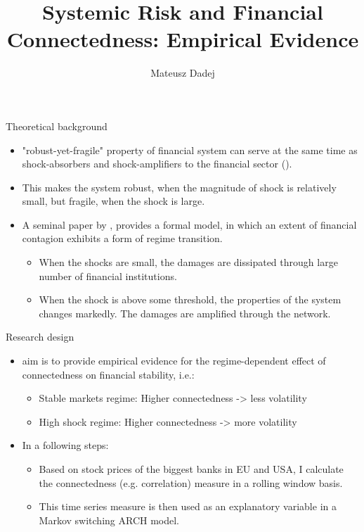 \documentclass{beamer}
\title{Systemic Risk and Financial Connectedness: Empirical Evidence}
\author{Mateusz Dadej}
\institute{Phd. student at Universita degli Studi di Brescia, ITA \\
Visiting researcher at Universität Mannheim, DE}
\begin{document}
\titlepage

\begin{frame}{Theoretical background}   
    \begin{itemize}
        \item "robust-yet-fragile" property of financial system can serve at the same time as shock-absorbers and shock-amplifiers to the financial sector (\cite{haldane}).
        \item This makes the system robust, when the magnitude of shock is relatively small, but fragile, when the shock is large. 
        \item A seminal paper by \cite{acemoglu}, provides a formal model, in which an extent of financial contagion exhibits a form of regime transition.
            \begin{itemize}
                \item When the shocks are small, the damages are dissipated through large number of financial institutions.
                \item When the shock is above some threshold, the properties of the system changes markedly. The damages are amplified through the network.
            \end{itemize}
    
    \end{itemize}
\end{frame}

\begin{frame}{Research design}

    \begin{itemize}
        \item aim is to provide empirical evidence for the regime-dependent effect of connectedness on financial stability, i.e.:
        \begin{itemize}
            \item Stable markets regime: Higher connectedness -> less volatility
            \item High shock regime: Higher connectedness -> more volatility
        \end{itemize}
        \item In a following steps:
        \begin{itemize}
            \item Based on stock prices of the biggest banks in EU and USA, I calculate the connectedness (e.g. correlation) measure in a rolling window basis.
            \item This time series measure is then used as an explanatory variable in a Markov switching ARCH model.    
        \end{itemize}
    \end{itemize}
    
\end{frame}  
\end{document}

